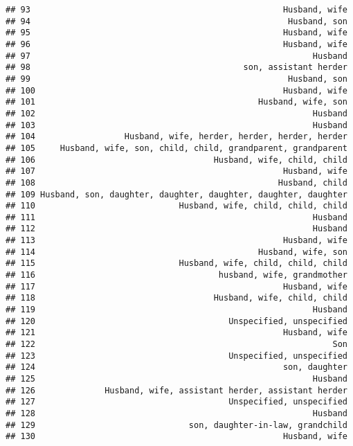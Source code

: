 \documentclass[
]{article}
\begin{document}
\begin{verbatim}
## 93                                                   Husband, wife
## 94                                                    Husband, son
## 95                                                   Husband, wife
## 96                                                   Husband, wife
## 97                                                         Husband
## 98                                           son, assistant herder
## 99                                                    Husband, son
## 100                                                  Husband, wife
## 101                                             Husband, wife, son
## 102                                                        Husband
## 103                                                        Husband
## 104                  Husband, wife, herder, herder, herder, herder
## 105     Husband, wife, son, child, child, grandparent, grandparent
## 106                                    Husband, wife, child, child
## 107                                                  Husband, wife
## 108                                                 Husband, child
## 109 Husband, son, daughter, daughter, daughter, daughter, daughter
## 110                             Husband, wife, child, child, child
## 111                                                        Husband
## 112                                                        Husband
## 113                                                  Husband, wife
## 114                                             Husband, wife, son
## 115                             Husband, wife, child, child, child
## 116                                     husband, wife, grandmother
## 117                                                  Husband, wife
## 118                                    Husband, wife, child, child
## 119                                                        Husband
## 120                                       Unspecified, unspecified
## 121                                                  Husband, wife
## 122                                                            Son
## 123                                       Unspecified, unspecified
## 124                                                  son, daughter
## 125                                                        Husband
## 126              Husband, wife, assistant herder, assistant herder
## 127                                       Unspecified, unspecified
## 128                                                        Husband
## 129                               son, daughter-in-law, grandchild
## 130                                                  Husband, wife

\end{verbatim}
\end{document}
